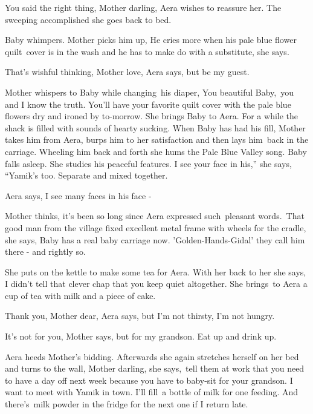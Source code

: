 \documentclass[twoside,11pt]{book}
\begin{document}
{\textquotedbl}You said the right thing, Mother darling,{\textquotedbl} Aera wishes to reassure her. The sweeping
accomplished she goes back to bed.\ 

Baby whimpers. Mother picks him up, {\textquotedbl}He cries more when his pale blue flower quilt\ cover is in the wash
and he has to make do with a substitute,{\textquotedbl} she says. 

{\textquotedbl}That's wishful thinking, Mother love,{\textquotedbl} Aera says, {\textquotedbl}but be my
guest.{\textquotedbl}\ 

Mother whispers to Baby while changing~his diaper, {\textquotedbl}You beautiful Baby,~you and I know the truth. You{}'ll
have your favorite quilt cover with the pale blue flowers dry and ironed by to-morrow.{\textquotedbl} She brings Baby
to Aera. For a while the shack is filled with sounds of hearty sucking. When Baby has had his fill, Mother takes him
from Aera, burps him to her satisfaction and then lays him~back in the carriage. Wheeling him back and forth she hums
the Pale Blue Valley song. Baby falls asleep. She studies his peaceful features. {\textquotedbl}I see your face in
his,{}'' she says, ``Yamik's too. Separate and mixed together.{\textquotedbl} 

Aera says, {\textquotedbl}I see many faces in his face -{\textquotedbl}~ 

Mother thinks, it's been so long since Aera expressed such{\ }pleasant words.\ {\textquotedbl}That good
man from the village fixed excellent metal frame with wheels for the cradle,{\textquotedbl} she says,
{\textquotedbl}Baby has a real baby carriage now. 'Golden-Hands-Gidal' they call him there - and rightly
so.{\textquotedbl} 

She puts on the kettle to make some tea for Aera. With her back to her she says, {\textquotedbl}I didn't tell that
clever chap that you keep quiet altogether.{\textquotedbl} She brings\  to Aera a cup of tea with milk and a piece of
cake. 

{\textquotedbl}Thank you, Mother dear,{\textquotedbl} Aera says, {\textquotedbl}but I'm not thirsty, I'm not
hungry.{\textquotedbl} 

{\textquotedbl}It's not for you,{\textquotedbl} Mother says, {\textquotedbl}but for my grandson. Eat up and drink
up.{\textquotedbl} 

Aera heeds Mother's bidding. Afterwards she again stretches herself on her bed and turns to the wall,
{\textquotedbl}Mother darling,{\textquotedbl} she says,\ {\textquotedbl}tell them at work that you need to have a day
off next week because you have to baby-sit for your grandson. I want to meet with Yamik in town. I'll fill~a bottle of
milk for one feeding. And there's~milk powder in the fridge for the next one if I return late.{\textquotedbl}
\end{document}
